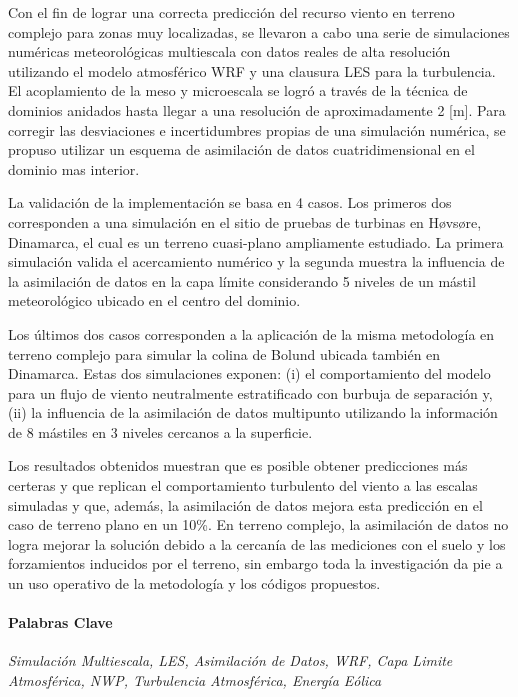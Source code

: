 Con el fin de lograr una correcta predicción del recurso viento en terreno complejo para zonas muy localizadas, se llevaron a cabo una serie de simulaciones numéricas meteorológicas multiescala con datos reales de alta resolución utilizando el modelo atmosférico WRF y una clausura LES para la turbulencia.
El acoplamiento de la meso y microescala se logró a través de la técnica de dominios anidados hasta llegar a una resolución de aproximadamente 2 [m]. Para corregir las desviaciones e incertidumbres propias de una simulación numérica, se propuso utilizar un esquema de asimilación de datos cuatridimensional en el dominio mas interior.

La validación de la implementación se basa en 4 casos. Los primeros dos corresponden a una simulación en el sitio de pruebas de turbinas en Høvsøre, Dinamarca, el cual es un terreno cuasi-plano ampliamente estudiado. La primera simulación valida el acercamiento numérico y la segunda muestra la influencia de la asimilación de datos en la capa límite considerando 5 niveles de un mástil meteorológico ubicado en el centro del dominio.

Los últimos dos casos corresponden a la aplicación de la misma metodología en terreno complejo para simular la colina de Bolund ubicada también en Dinamarca. Estas dos simulaciones exponen: (i) el comportamiento del modelo para un flujo de viento neutralmente estratificado con burbuja de separación y, (ii) la influencia de la asimilación de datos multipunto utilizando la información de 8 mástiles en 3 niveles cercanos a la superficie.

Los resultados obtenidos muestran que es posible obtener predicciones más certeras y que replican el comportamiento turbulento del viento a las escalas simuladas y que, además, la asimilación de datos mejora esta predicción en el caso de terreno plano en un 10\%. En terreno complejo, la asimilación de datos no logra mejorar la solución debido a la cercanía de las mediciones con el suelo y los forzamientos inducidos por el terreno, sin embargo toda la investigación da pie a un uso operativo de la metodología y los códigos propuestos.

\paragraph{Palabras Clave} \emph{Simulación Multiescala, LES, Asimilación de Datos, WRF, Capa Limite Atmosférica, NWP, Turbulencia Atmosférica, Energía Eólica}